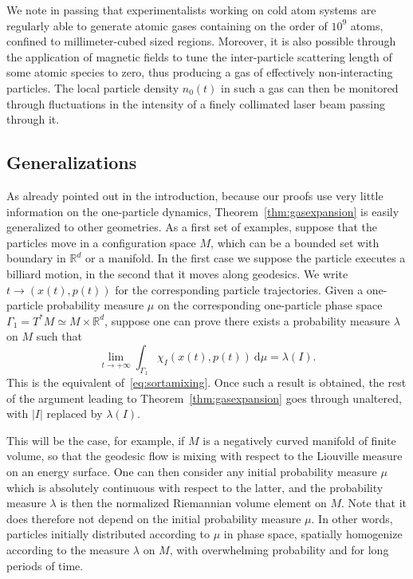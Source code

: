 \documentclass{article}
\newcommand {\R}{\mathbb{R}}
\newcommand {\rd}{\mathrm{d}}
\numberwithin{equation}{section}
\begin{document}
We note in passing that experimentalists working on cold atom systems are regularly able to generate atomic gases containing on the order of $10^{9}$ atoms, confined to millimeter-cubed sized regions. Moreover, it is also possible through the application of magnetic fields to tune the inter-particle scattering length of some atomic species to zero, thus producing a gas of effectively non-interacting particles. The local particle density $n_{0} (t)$ in such a gas can then be monitored through fluctuations in the intensity of a finely collimated laser beam passing through it.


\subsection{Generalizations}
 As already pointed out in the introduction, because our proofs use very little information on the one-particle dynamics, Theorem~\ref{thm:gasexpansion} is easily generalized to other geometries. As a first set of examples, suppose that the particles move in a configuration space $M$, which can be a bounded set with boundary in $\R^d$ or a manifold. In the first case we suppose the particle executes a billiard motion, in the second that it moves along geodesics. We write $t\to (x(t), p(t))$ for the corresponding particle trajectories. Given a one-particle probability measure $\mu$ on the corresponding one-particle phase space $\Gamma_1=T^*M\simeq M\times\R^d$, suppose one can prove there exists a probability  measure $\lambda$ on $M$ such that
\begin{equation}
\lim_{t\to+\infty}\int_{\Gamma_1} \chi_I(x(t),p(t))\ \rd \mu=\lambda(I).
\end{equation}
This is the equivalent of~\eqref{eq:sortamixing}.
Once such a result is obtained, the rest of the argument leading to Theorem~\ref{thm:gasexpansion} goes through unaltered, with $|I|$ replaced by $\lambda(I)$.

This will be the case, for example, if $M$ is a negatively curved manifold of finite volume, so that the geodesic flow is mixing with respect to the Liouville measure on an energy surface. One can then consider any initial probability measure $\mu$ which is absolutely continuous with respect to the latter, and the probability measure $\lambda$ is then the normalized Riemannian volume element on $M$. Note that it  does therefore not depend on the initial probability measure $\mu$. In other words, particles initially distributed according to $\mu$  in phase space, spatially homogenize according to the measure $\lambda$ on $M$, with overwhelming probability and for long periods of time.
\end{document}
